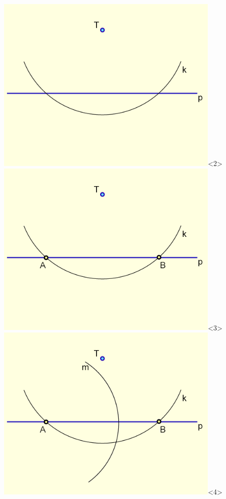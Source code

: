 \documentclass[11pt,hyperref={unicode}]{beamer}
\begin{document}
\begin{frame}
\begin{columns}
\begin{column}{0.5\textwidth}
\begin{center}
            \includegraphics[width=0.8\textwidth,keepaspectratio]{pic2.png}<2>
            \includegraphics[width=0.8\textwidth,keepaspectratio]{pic3.png}<3>
            \includegraphics[width=0.8\textwidth,keepaspectratio]{pic4.png}<4>

\end{center}
\end{column}
\end{columns}
\end{frame}
\end{document}
